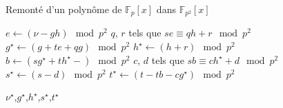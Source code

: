 \begin{algorithm}
  \caption{Remonté d'un polynôme de $\mathbb{F}_p[x]$ dans $\mathbb{F}_{p^2}[x]$}
  \label{alg:step}  
  \begin{algorithmic}[1]
    \Statex

    \State   $e \gets (\nu - gh) \mod p^2$
    \State $q$, $r$ tels que $se \equiv qh + r \mod p^2$
    \State $g^{\star} \gets (g+te+qg) \mod p^2$
    \State $h^{\star} \gets (h+r) \mod p^2$
    \State $b \gets (sg^{\star} + th^{\star} -) \mod p^2$
    \State $c$, $d$ tels que $sb \equiv ch^{\star} + d \mod p^2$
    \State $s^{\star} \gets (s-d) \mod p^2$
    \State $t^{\star} \gets (t-tb-cg^{\star}) \mod p^2$

      \State \Return $\nu^{\star}$,$g^{\star}$,$h^{\star}$,$s^{\star}$,$t^{\star}$
    \EndFunction
  \end{algorithmic}
\end{algorithm}
